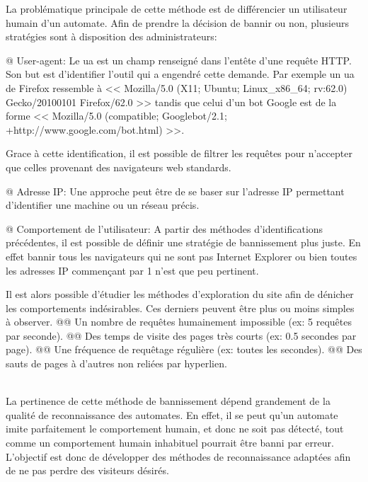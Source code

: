 \documentclass[hideweeklyreports,noposter]{polytech/polytech}
\begin{document}
			La problématique principale de cette méthode est de différencier un utilisateur humain d'un automate.
			Afin de prendre la décision de bannir ou non, plusieurs stratégies sont à disposition des administrateurs:
			
			\begin{easylist}[itemize]
				@ User-agent: Le \gls{ua} est un champ renseigné dans l'entête d'une requête HTTP.
				Son but est d'identifier l'outil qui a engendré cette demande.
				Par exemple un \gls{ua} de Firefox ressemble à << Mozilla/5.0 (X11; Ubuntu; Linux\_x86\_64; rv:62.0) Gecko/20100101 Firefox/62.0 >> tandis que celui d'un bot Google est de la forme << Mozilla/5.0 (compatible; Googlebot/2.1; +http://www.google.com/bot.html) >>.
				
				Grace à cette identification, il est possible de filtrer les requêtes pour n'accepter que celles provenant des navigateurs web standards.
				
				@ Adresse IP: Une approche peut être de se baser sur l'adresse IP permettant d'identifier une machine ou un réseau précis.
				
				@ Comportement de l'utilisateur: A partir des méthodes d'identifications précédentes, il est possible de définir une stratégie de bannissement plus juste.
				En effet bannir tous les navigateurs qui ne sont pas Internet Explorer ou bien toutes les adresses IP commençant par 1 n'est que peu pertinent.
				
				Il est alors possible d'étudier les méthodes d'exploration du site afin de dénicher les comportements indésirables.
				Ces derniers peuvent être plus ou moins simples à observer.
				@@ Un nombre de requêtes humainement impossible (ex: 5 requêtes par seconde).
				@@ Des temps de visite des pages très courts (ex: 0.5 secondes par page).
				@@ Une fréquence de requêtage régulière (ex: toutes les secondes).
				@@ Des sauts de pages à d'autres non reliées par hyperlien.
			\end{easylist}
			~\\
			
			La pertinence de cette méthode de bannissement dépend grandement de la qualité de reconnaissance des automates.
			En effet, il se peut qu'un automate imite parfaitement le comportement humain, et donc ne soit pas détecté, tout comme un comportement humain inhabituel pourrait être banni par erreur.
			L'objectif est donc de développer des méthodes de reconnaissance adaptées afin de ne pas perdre des visiteurs désirés.
			
\end{document}
